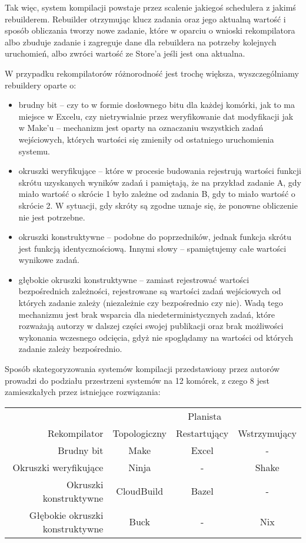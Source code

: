 
Tak więc, system kompilacji powstaje przez scalenie jakiegoś schedulera z jakimś rebuilderem. Rebuilder otrzymując klucz zadania oraz jego aktualną wartość i sposób obliczania tworzy nowe zadanie, które w oparciu o wnioski rekompilatora albo zbuduje zadanie i zagreguje dane dla rebuildera na potrzeby kolejnych uruchomień, albo zwróci wartość ze Store'a jeśli jest ona aktualna.

W przypadku rekompilatorów różnorodność jest trochę większa, wyszczególniamy rebuildery oparte o:
\begin{itemize}
\item brudny bit -- czy to w formie dosłownego bitu dla każdej komórki, jak to ma miejsce w Excelu, czy nietrywialnie przez weryfikowanie dat modyfikacji jak w Make'u -- mechanizm jest oparty na oznaczaniu wszystkich zadań wejściowych, których wartości się zmieniły od ostatniego uruchomienia systemu.
\item okruszki weryfikujące -- które w procesie budowania rejestrują wartości funkcji skrótu uzyskanych wyników zadań i pamiętają, że na przykład zadanie A, gdy miało wartość o skrócie 1 było zależne od zadania B, gdy to miało wartość o skrócie 2. W sytuacji, gdy skróty są zgodne uznaje się, że ponowne obliczenie nie jest potrzebne.
\item okruszki konstruktywne -- podobne do poprzedników, jednak funkcja skrótu jest funkcją identycznościową. Innymi słowy -- spamiętujemy całe wartości wynikowe zadań.
\item głębokie okruszki konstruktywne -- zamiast rejestrować wartości bezpośrednich zależności, rejestrowane są wartości zadań wejściowych od których zadanie zależy (niezależnie czy bezpośrednio czy nie). Wadą tego mechanizmu jest brak wsparcia dla niedeterministycznych zadań, które rozważają autorzy w dalszej części swojej publikacji oraz brak możliwości wykonania wczesnego odcięcia, gdyż nie spoglądamy na wartości od których zadanie zależy bezpośrednio.
\end{itemize}

Sposób skategoryzowania systemów kompilacji przedstawiony przez autorów prowadzi do podziału przestrzeni systemów na 12 komórek, z czego 8 jest zamieszkałych przez istniejące rozwiązania:

\begin{tabular}{r | c c c}
\hline
                                & \multicolumn{3}{c}{Planista} \\
Rekompilator                    & Topologiczny & Restartujący & Wstrzymujący \\
\hline
Brudny bit                      & Make         & Excel        & - \\
Okruszki weryfikujące           & Ninja        & -            & Shake \\
Okruszki konstruktywne          & CloudBuild   & Bazel        & -\\
Głębokie okruszki konstruktywne & Buck         & -            & Nix \\
\hline
\end{tabular}

